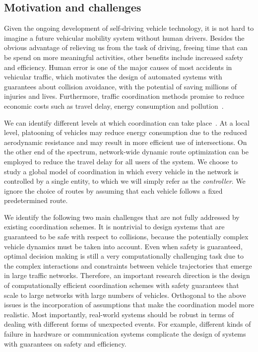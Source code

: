 \documentclass[notitlepage]{report}
\begin{document}
\subsection*{Motivation and challenges}

Given the ongoing development of self-driving vehicle technology, it is not hard
to imagine a future vehicular mobility system without human drivers. Besides the
obvious advantage of relieving us from the task of driving, freeing time that
can be spend on more meaningful activities, other benefits include increased
safety and efficiency. Human error is one of the major causes of most accidents
in vehicular traffic, which motivates the design of automated systems with
guarantees about collision avoidance, with the potential of saving millions of
injuries and lives. Furthermore, traffic coordination methods promise to reduce
economic costs such as travel delay, energy consumption and
pollution~\cite{fagnantPreparingNationAutonomous2015}.


We can identify different levels at which coordination can take
place~\cite{marianiCoordinationAutonomousVehicles2022}. At a local level,
platooning of vehicles may reduce energy consumption due to the reduced
aerodynamic resistance and may result in more efficient use of intersections. On
the other end of the spectrum, network-wide dynamic route optimization can be
employed to reduce the travel delay for all users of the system.
%
We choose to study a global model of coordination in which every vehicle in the
network is controlled by a single entity, to which we will simply refer as the
\textit{controller}. We ignore the choice of routes by assuming that each
vehicle follows a fixed predetermined route.

We identify the following two main challenges that are not fully addressed by
existing coordination schemes.
It is nontrivial to design systems that are guaranteed to be safe
with respect to collisions, because the potentially complex vehicle dynamics
must be taken into account.
Even when safety is guaranteed, optimal decision making is still a very
computationally challenging task due to the complex interactions and constraints
between vehicle trajectories that emerge in large traffic networks. Therefore,
an important research direction is the design of computationally efficient
coordination schemes with safety guarantees that scale to large networks with
large numbers of vehicles.
Orthogonal to the above issues is the incorporation of assumptions that make the
coordination model more realistic. Most importantly, real-world systems should
be robust in terms of dealing with different forms of unexpected events. For
example, different kinds of failure in hardware or communication systems
complicate the design of systems with guarantees on safety and efficiency.
\end{document}
